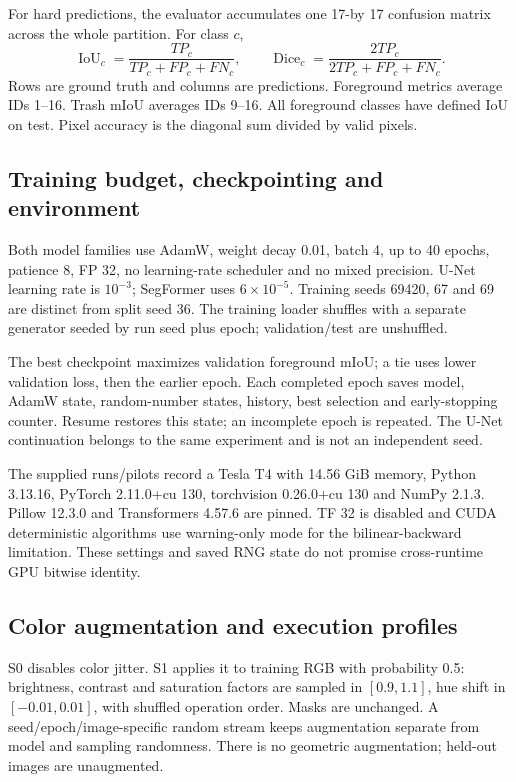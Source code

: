 For hard predictions, the evaluator accumulates one 17-by 17 confusion matrix across the whole partition. For class $c$,
\begin{equation}
\operatorname{IoU}_c=\frac{TP_c}{TP_c+FP_c+FN_c},\qquad
\operatorname{Dice}_c=\frac{2TP_c}{2TP_c+FP_c+FN_c}.
\end{equation}
Rows are ground truth and columns are predictions. Foreground metrics average IDs 1--16. Trash mIoU averages IDs 9--16. All foreground classes have defined IoU on test. Pixel accuracy is the diagonal sum divided by valid pixels.

\par
\endgroup
\clearpage
\subsection{Training budget, checkpointing and environment}
Both model families use AdamW, weight decay 0.01, batch 4, up to 40 epochs, patience 8, FP 32, no learning-rate scheduler and no mixed precision. U-Net learning rate is $10^{-3}$; SegFormer uses $6\times 10^{-5}$. Training seeds 69420, 67 and 69 are distinct from split seed 36. The training loader shuffles with a separate generator seeded by run seed plus epoch; validation/test are unshuffled.

The best checkpoint maximizes validation foreground mIoU; a tie uses lower validation loss, then the earlier epoch. Each completed epoch saves model, AdamW state, random-number states, history, best selection and early-stopping counter. Resume restores this state; an incomplete epoch is repeated. The U-Net continuation belongs to the same experiment and is not an independent seed.

The supplied runs/pilots record a Tesla T4 with 14.56 GiB memory, Python 3.13.16, PyTorch 2.11.0+cu 130, torchvision 0.26.0+cu 130 and NumPy 2.1.3. Pillow 12.3.0 and Transformers 4.57.6 are pinned. TF 32 is disabled and CUDA deterministic algorithms use warning-only mode for the bilinear-backward limitation. These settings and saved RNG state do not promise cross-runtime GPU bitwise identity.

\subsection{Color augmentation and execution profiles}
S0 disables color jitter. S1 applies it to training RGB with probability 0.5: brightness, contrast and saturation factors are sampled in $[0.9,1.1]$, hue shift in $[-0.01,0.01]$, with shuffled operation order. Masks are unchanged. A seed/epoch/image-specific random stream keeps augmentation separate from model and sampling randomness. There is no geometric augmentation; held-out images are unaugmented.

